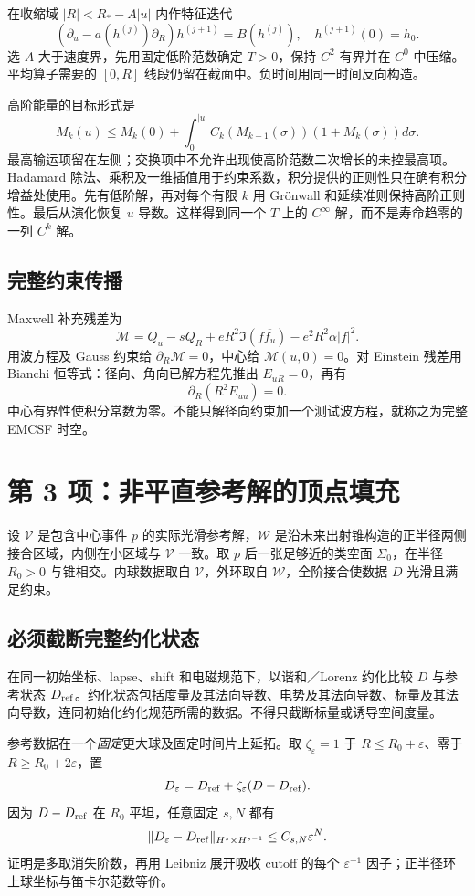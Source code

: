 在收缩域 $|R|<R_*-A|u|$ 内作特征迭代
\[
(\partial_u-a(h^{(j)})\partial_R)h^{(j+1)}=B(h^{(j)}),
\quad h^{(j+1)}(0)=h_0.
\]
选 $A$ 大于速度界，先用固定低阶范数确定 $T>0$，保持 $C^2$ 有界并在 $C^0$ 中压缩。平均算子需要的 $[0,R]$ 线段仍留在截面中。负时间用同一时间反向构造。

高阶能量的目标形式是
\begin{equation}\label{eq:high}
M_k(u)\le M_k(0)+\int_0^{|u|}
C_k(M_{k-1}(\sigma))(1+M_k(\sigma))d\sigma.
\end{equation}
最高输运项留在左侧；交换项中不允许出现使高阶范数二次增长的未控最高项。Hadamard 除法、乘积及一维插值用于约束系数，积分提供的正则性只在确有积分增益处使用。先有低阶解，再对每个有限 $k$ 用 Gr\"onwall 和延续准则保持高阶正则性。最后从演化恢复 $u$ 导数。这样得到同一个 $T$ 上的 $C^\infty$ 解，而不是寿命趋零的一列 $C^k$ 解。

\subsection{完整约束传播}
Maxwell 补充残差为
\[
\mathcal M=Q_u-sQ_R+eR^2\Im(f\overline{f_u})
-e^2R^2\alpha|f|^2.
\]
用波方程及 Gauss 约束给 $\partial_R\mathcal M=0$，中心给 $\mathcal M(u,0)=0$。对 Einstein 残差用 Bianchi 恒等式：径向、角向已解方程先推出 $E_{uR}=0$，再有
\[
\partial_R(R^2E_{uu})=0.
\]
中心有界性使积分常数为零。不能只解径向约束加一个测试波方程，就称之为完整 EMCSF 时空。

\section{第 3 项：非平直参考解的顶点填充}
设 $\mathcal V$ 是包含中心事件 $p$ 的实际光滑参考解，$\mathcal W$ 是沿未来出射锥构造的正半径两侧接合区域，内侧在小区域与 $\mathcal V$ 一致。取 $p$ 后一张足够近的类空面 $\Sigma_0$，在半径 $R_0>0$ 与锥相交。内球数据取自 $\mathcal V$，外环取自 $\mathcal W$，全阶接合使数据 $D$ 光滑且满足约束。

\subsection{必须截断完整约化状态}
在同一初始坐标、lapse、shift 和电磁规范下，以谐和／Lorenz 约化比较 $D$ 与参考状态 $D_{\rm ref}$。约化状态包括度量及其法向导数、电势及其法向导数、标量及其法向导数，连同初始化约化规范所需的数据。不得只截断标量或诱导空间度量。

参考数据在一个\emph{固定}更大球及固定时间片上延拓。取 $\zeta_\varepsilon=1$ 于 $R\le R_0+\varepsilon$、零于 $R\ge R_0+2\varepsilon$，置
\[
D_\varepsilon=D_{\rm ref}+\zeta_\varepsilon(D-D_{\rm ref}).
\]
因为 $D-D_{\rm ref}$ 在 $R_0$ 平坦，任意固定 $s,N$ 都有
\begin{equation}\label{eq:flat}
\|D_\varepsilon-D_{\rm ref}\|_{H^s\times H^{s-1}}
\le C_{s,N}\varepsilon^N.
\end{equation}
证明是多取消失阶数，再用 Leibniz 展开吸收 cutoff 的每个 $\varepsilon^{-1}$ 因子；正半径环上球坐标与笛卡尔范数等价。

